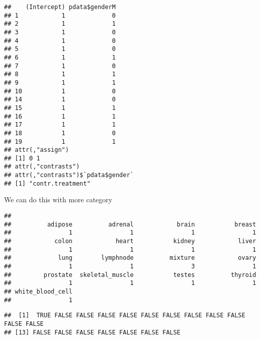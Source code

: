 \documentclass[]{article}
\newenvironment{Shaded}{\begin{snugshade}}{\end{snugshade}}
\newcommand{\KeywordTok}[1]{\textcolor[rgb]{0.13,0.29,0.53}{\textbf{#1}}}
\newcommand{\StringTok}[1]{\textcolor[rgb]{0.31,0.60,0.02}{#1}}
\newcommand{\OperatorTok}[1]{\textcolor[rgb]{0.81,0.36,0.00}{\textbf{#1}}}
\newcommand{\NormalTok}[1]{#1}
\begin{document}
\begin{verbatim}
##    (Intercept) pdata$genderM
## 1            1             0
## 2            1             1
## 3            1             0
## 4            1             0
## 5            1             0
## 6            1             1
## 7            1             0
## 8            1             1
## 9            1             1
## 10           1             0
## 14           1             0
## 15           1             1
## 16           1             1
## 17           1             1
## 18           1             0
## 19           1             1
## attr(,"assign")
## [1] 0 1
## attr(,"contrasts")
## attr(,"contrasts")$`pdata$gender`
## [1] "contr.treatment"
\end{verbatim}

We can do this with more category

\begin{Shaded}
\end{Shaded}

\begin{verbatim}
## 
##          adipose          adrenal            brain           breast 
##                1                1                1                1 
##            colon            heart           kidney            liver 
##                1                1                1                1 
##             lung        lymphnode          mixture            ovary 
##                1                1                3                1 
##         prostate  skeletal_muscle           testes          thyroid 
##                1                1                1                1 
## white_blood_cell 
##                1
\end{verbatim}

\begin{Shaded}
\end{Shaded}

\begin{verbatim}
##  [1]  TRUE FALSE FALSE FALSE FALSE FALSE FALSE FALSE FALSE FALSE FALSE FALSE
## [13] FALSE FALSE FALSE FALSE FALSE FALSE FALSE
\end{verbatim}
\end{document}
